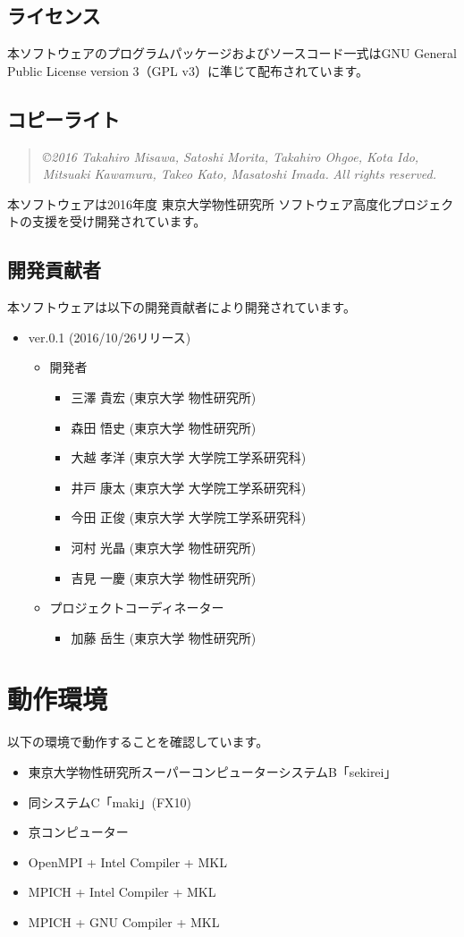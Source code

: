 \subsection{ライセンス}
本ソフトウェアのプログラムパッケージおよびソースコード一式はGNU General Public License version 3（GPL v3）に準じて配布されています。

\subsection{コピーライト}
\begin{quote}
{\it \copyright  2016 Takahiro Misawa, Satoshi Morita, Takahiro Ohgoe, Kota Ido, Mitsuaki Kawamura, Takeo Kato, Masatoshi Imada.} {\it All rights reserved.}
\end{quote}
本ソフトウェアは2016年度 東京大学物性研究所 ソフトウェア高度化プロジェクトの支援を受け開発されています。

\subsection{開発貢献者}
\label{subsec:developers}
本ソフトウェアは以下の開発貢献者により開発されています。
\begin{itemize}
\item{ver.0.1 (2016/10/26リリース)}
\begin{itemize}
\item{開発者}
	\begin{itemize}
	\item{三澤 貴宏 (東京大学 物性研究所)}
	\item{森田 悟史 (東京大学 物性研究所)}
	\item{大越 孝洋 (東京大学 大学院工学系研究科)}
	\item{井戸 康太 (東京大学 大学院工学系研究科)}
	\item{今田 正俊 (東京大学 大学院工学系研究科)}
	\item{河村 光晶 (東京大学 物性研究所)}
	\item{吉見 一慶 (東京大学 物性研究所)}
	\end{itemize}

\item{プロジェクトコーディネーター}
	\begin{itemize}
	\item{加藤 岳生 (東京大学 物性研究所)}
	\end{itemize}

\end{itemize}

\end{itemize}


\section{動作環境}
 以下の環境で動作することを確認しています。
\begin{itemize}
\item 東京大学物性研究所スーパーコンピューターシステムB「sekirei」
\item 同システムC「maki」(FX10)
\item 京コンピューター
\item OpenMPI + Intel Compiler + MKL
\item MPICH + Intel Compiler + MKL
\item MPICH + GNU Compiler + MKL
\end{itemize}
